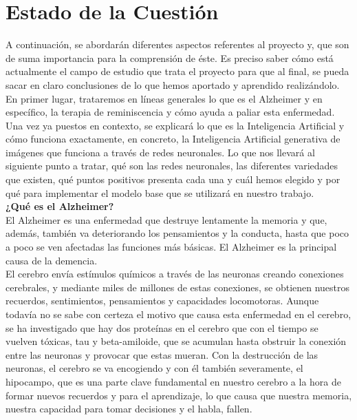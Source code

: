 \chapter{Estado de la Cuestión}
\label{cap:estadoDeLaCuestion}


A continuación, se abordarán diferentes aspectos referentes al proyecto y, que son de suma importancia para la comprensión de éste. Es preciso saber cómo está actualmente el campo de estudio que trata el proyecto para que al final, se pueda sacar en claro conclusiones de lo que hemos aportado y aprendido realizándolo.\\ 

En primer lugar, trataremos en líneas generales lo que es el Alzheimer y en específico, la terapia de reminiscencia y cómo ayuda a paliar esta enfermedad. Una vez ya puestos en contexto, se explicará lo que es la Inteligencia Artificial y cómo funciona exactamente, en concreto, la Inteligencia Artificial generativa de imágenes que funciona a través de redes neuronales. Lo que nos llevará al siguiente punto a tratar, qué son las redes neuronales, las diferentes variedades que existen, qué puntos positivos presenta cada una y cuál hemos elegido y por qué para implementar el modelo base que se utilizará en nuestro trabajo. \\

\textbf{¿Qué es el Alzheimer?}\\

El Alzheimer es una enfermedad que destruye lentamente la memoria y que, además, también va deteriorando los pensamientos y la conducta, hasta que poco a poco se ven afectadas las funciones más básicas. El Alzheimer es la principal causa de la demencia.\\

El cerebro envía estímulos químicos a través de las neuronas creando conexiones cerebrales, y mediante miles de millones de estas conexiones, se obtienen nuestros recuerdos, sentimientos, pensamientos y capacidades locomotoras. Aunque todavía no se sabe con certeza el motivo que causa esta enfermedad en el cerebro, se ha investigado que hay dos proteínas en el cerebro que con el tiempo se vuelven tóxicas, tau y beta-amiloide, que se acumulan hasta obstruir la conexión entre las neuronas y provocar que estas mueran.  Con la destrucción de las neuronas, el cerebro se va encogiendo y con él también severamente, el hipocampo, que es una parte clave fundamental en nuestro cerebro a la hora de formar nuevos recuerdos y para el aprendizaje, lo que causa que nuestra memoria, nuestra capacidad para tomar decisiones y el habla, fallen.\\

